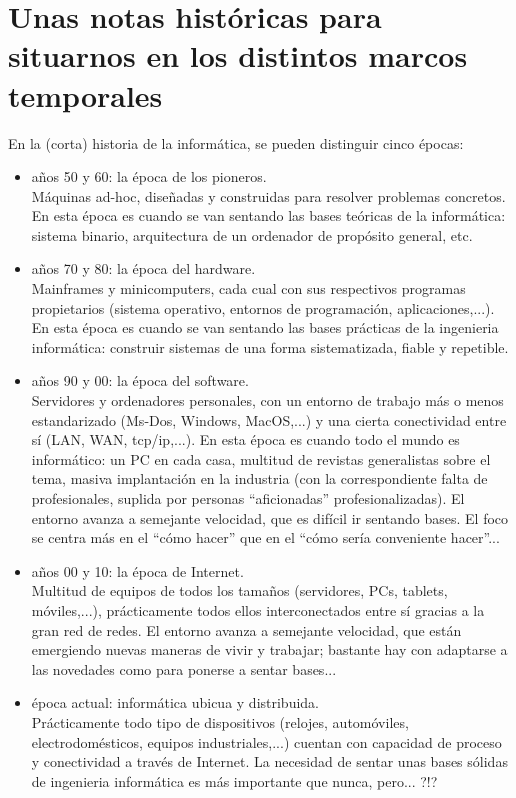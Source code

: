\documentclass[spanish,12pt,a4paper,final,oneside]{book}
\begin{document}
\chapter{Unas notas históricas para situarnos en los distintos marcos temporales}
En la (corta) historia de la informática, se pueden distinguir cinco épocas:
\begin{itemize}
\item años 50 y 60: la época de los pioneros. 
\\Máquinas ad-hoc, diseñadas y construidas para resolver problemas concretos. En esta época es cuando se van sentando las bases teóricas de la informática: sistema binario, arquitectura de un ordenador de propósito general, etc.
\item años 70 y 80: la época del hardware. 
\\Mainframes y minicomputers, cada cual con sus respectivos programas propietarios (sistema operativo, entornos de programación, aplicaciones,...). En esta época es cuando se van sentando las bases prácticas de la ingenieria informática: construir sistemas de una forma sistematizada, fiable y repetible.
\item años 90 y 00: la época del software. 
\\Servidores y ordenadores personales, con un entorno de trabajo más o menos estandarizado (Ms-Dos, Windows, MacOS,...) y una cierta conectividad entre sí (LAN, WAN, tcp/ip,...). En esta época es cuando todo el mundo es informático: un PC en cada casa, multitud de revistas generalistas sobre el tema, masiva implantación en la industria (con la correspondiente falta de profesionales, suplida por personas ``aficionadas'' profesionalizadas). El entorno avanza a semejante velocidad, que es difícil ir sentando bases. El foco se centra más en el ``cómo hacer'' que en el ``cómo sería conveniente hacer''...
\item años 00 y 10: la época de Internet. 
\\Multitud de equipos de todos los tamaños (servidores, PCs, tablets, móviles,...), prácticamente todos ellos interconectados entre sí gracias a la gran red de redes. El entorno avanza a semejante velocidad, que están emergiendo nuevas maneras de vivir y trabajar; bastante hay con adaptarse a las novedades como para ponerse a sentar bases...
\item época actual: informática ubicua y distribuida. 
\\Prácticamente todo tipo de dispositivos (relojes, automóviles, electrodomésticos, equipos industriales,...) cuentan con capacidad de proceso y conectividad a través de Internet. La necesidad de sentar unas bases sólidas de ingenieria informática es más importante que nunca, pero... ?!?
\end{itemize}
\end{document}
